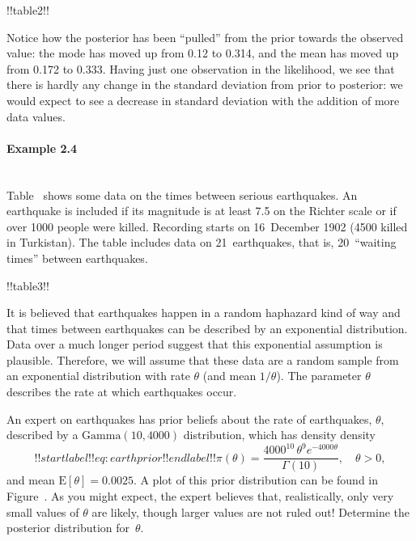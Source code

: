 {\begin{figure}[h!]
\end{figure}



!!table2!!

Notice how the posterior has been ``pulled'' from the prior towards the observed value: the mode has moved up from 0.12 to 0.314, and the mean has moved up from 0.172 to 0.333.  Having just one observation in the likelihood, we see that there is hardly any change in the standard deviation from prior to posterior: we would expect to see a decrease in standard deviation with the addition of more data values.}




\paragraph{Example 2.4}{~\\
Table~ shows some data on the times between serious  earthquakes. An earthquake is included if its magnitude is at least 7.5 on the Richter scale or if over 1000 people were killed. Recording starts on 16~December 1902 (4500 killed in Turkistan). The table includes data on 21~earthquakes, that is, 20~``waiting times'' between earthquakes. 



!!table3!!

It is believed that earthquakes happen in a random haphazard kind of way and that times between earthquakes can be described by an exponential distribution. Data over a much longer period suggest that this exponential assumption is plausible. Therefore, we will assume that these data are a random sample from an exponential distribution with rate $\theta$ (and mean $1/\theta$). The parameter $\theta$ describes the rate at which earthquakes occur. 

An expert on earthquakes has prior beliefs about the rate of earthquakes, $\theta$, described by a $\mathrm{Gamma}(10,4000)$ distribution, which has density
density
\begin{equation}
!!startlabel!! eq:earthprior !!endlabel!!
\pi(\theta)=\frac{4000^{10}\,\theta^9e^{-4000\theta}}{\Gamma(10)}, 
\quad\theta>0, 
\end{equation}
and mean $\text{E}[\theta]=0.0025$. A plot of this prior distribution can be found in Figure~.  As you might expect, the expert believes that, realistically, only very small values of $\theta$ are likely, though larger values are not ruled out!  Determine the posterior distribution for~$\theta$.
\begin{figure}[ht]


\end{figure}}
